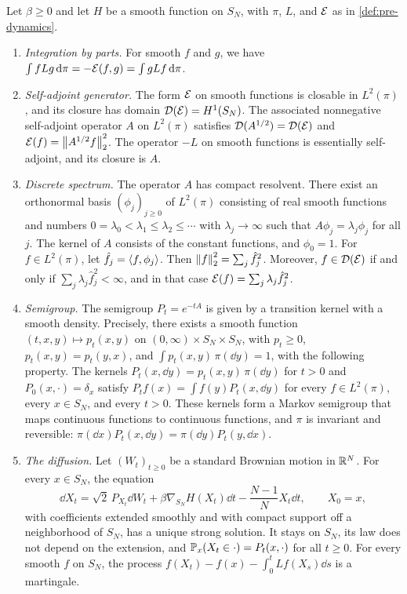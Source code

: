 \begin{lemma}\label{lem:pre-dynamics}
Let $\beta\ge0$ and let $H$ be a smooth function on $S_N$, with $\pi$, $L$, and $\mathcal E$ as in \cref{def:pre-dynamics}.
\begin{enumerate}
\item \emph{Integration by parts.} For smooth $f$ and $g$, we have $\int fLg\,\mathrm d\pi=-\mathcal E(f,g)=\int gLf\,\mathrm d\pi$.
\item \emph{Self-adjoint generator.} The form $\mathcal E$ on smooth functions is closable in $L^2(\pi)$, and its closure has domain $\mathcal D(\mathcal E)=H^1(S_N)$. The associated nonnegative self-adjoint operator $A$ on $L^2(\pi)$ satisfies $\mathcal D(A^{1/2})=\mathcal D(\mathcal E)$ and $\mathcal E(f)=\left\lVert A^{1/2}f\right\rVert_2^2$. The operator $-L$ on smooth functions is essentially self-adjoint, and its closure is $A$.
\item \emph{Discrete spectrum.} The operator $A$ has compact resolvent. There exist an orthonormal basis $(\phi_j)_{j\ge0}$ of $L^2(\pi)$ consisting of real smooth functions and numbers $0=\lambda_0<\lambda_1\le\lambda_2\le\cdots$ with $\lambda_j\to\infty$ such that $A\phi_j=\lambda_j\phi_j$ for all $j$. The kernel of $A$ consists of the constant functions, and $\phi_0=1$. For $f\in L^2(\pi)$, let $\hat f_j=\langle f,\phi_j\rangle$. Then $\left\lVert f\right\rVert_2^2=\sum_j\hat f_j^2$. Moreover, $f\in\mathcal D(\mathcal E)$ if and only if $\sum_j\lambda_j\hat f_j^2<\infty$, and in that case $\mathcal E(f)=\sum_j\lambda_j\hat f_j^2$.
\item \emph{Semigroup.} The semigroup $P_t=e^{-tA}$ is given by a transition kernel with a smooth density. Precisely, there exists a smooth function $(t,x,y)\mapsto p_t(x,y)$ on $(0,\infty)\times S_N\times S_N$, with $p_t\ge0$, $p_t(x,y)=p_t(y,x)$, and $\int p_t(x,y)\,\pi(\dd y)=1$, with the following property. The kernels $P_t(x,\dd y)=p_t(x,y)\,\pi(\dd y)$ for $t>0$ and $P_0(x,\cdot)=\delta_x$ satisfy $P_tf(x)=\int f(y)P_t(x,\dd y)$ for every $f\in L^2(\pi)$, every $x\in S_N$, and every $t>0$. These kernels form a Markov semigroup that maps continuous functions to continuous functions, and $\pi$ is invariant and reversible: $\pi(\dd x)P_t(x,\dd y)=\pi(\dd y)P_t(y,\dd x)$.
\item \emph{The diffusion.} Let $(W_t)_{t\ge0}$ be a standard Brownian motion in $\mathbb R^N$. For every $x\in S_N$, the equation
\begin{equation}\label{eq:pre-sde}
\dd X_t=\sqrt2\,P_{X_t}\dd W_t+\beta\nabla_{S_N}H(X_t)\dd t-\frac{N-1}{N}X_t\dd t,\qquad X_0=x,
\end{equation}
with coefficients extended smoothly and with compact support off a neighborhood of $S_N$, has a unique strong solution. It stays on $S_N$, its law does not depend on the extension, and $\mathbb P_x(X_t\in\cdot)=P_t(x,\cdot)$ for all $t\ge0$. For every smooth $f$ on $S_N$, the process $f(X_t)-f(x)-\int_0^tLf(X_s)\dd s$ is a martingale.
\end{enumerate}
\end{lemma}

